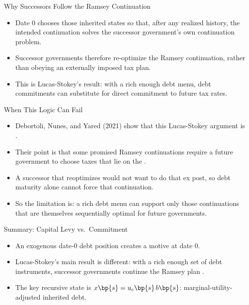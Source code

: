 \documentclass[11pt,xcolor={dvipsnames},aspectratio=159,hyperref={pdftex,pdfpagemode=UseNone,hidelinks,pdfdisplaydoctitle=true},usepdftitle=false]{beamer}
\begin{document}
	            \begin{frame}{Why Successors Follow the Ramsey Continuation}
	                \begin{itemize}
	                \item Date 0 chooses those inherited states so that, after any realized history, the intended continuation solves the successor government's own continuation problem.
	                \item Successor governments therefore re-optimize  the Ramsey continuation, rather than obeying an externally imposed tax plan.
	                \item This is Lucas-Stokey's result: with a rich enough debt menu, debt commitments can substitute for direct commitment to future tax rates.
	                \end{itemize}
	            \end{frame}

	            \begin{frame}{When This Logic Can Fail}
	                \begin{itemize}
	                \item Debortoli, Nunes, and Yared (2021) show that this Lucas-Stokey argument is .
	                \item Their point is that some promised Ramsey continuations require a future government to choose taxes that lie on the .
	                \item A successor that reoptimizes would not want to do that ex post, so debt maturity alone cannot force that continuation.
	                \item So the limitation is: a rich debt menu can support only those continuations that are themselves sequentially optimal for future governments.
	                \end{itemize}
	            \end{frame}

	            \begin{frame}{Summary: Capital Levy vs.\ Commitment}
	                \begin{itemize}
	                \item An exogenous date-0 debt position creates a  motive at date 0.
	                \item Lucas-Stokey's main result is different: with a rich enough set of debt instruments, successor governments continue the Ramsey plan .
	                \item The key recursive state is $x\bp{s} = u_c\bp{s}\,b\bp{s}$: marginal-utility-adjusted inherited debt.
	                \end{itemize}
	            \end{frame}
\end{document}
